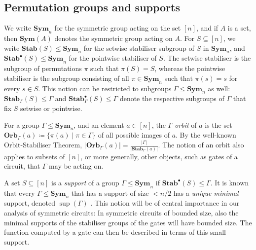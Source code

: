 \documentclass[11pt]{article}
\DeclareMathOperator{\supp}{sup}
\newcommand{\Sym}{\mathbf{Sym}}
\newcommand{\Stab}{\mathbf{Stab}}
\newcommand{\StabP}{\mathbf{Stab}^{\bullet}}
\newcommand{\Orb}{\mathbf{Orb}}
\theoremstyle{definition}
\theoremstyle{plain}
\theoremstyle{remark}
\theoremstyle{remark}
\begin{document}
\subsection{Permutation groups and supports}
\label{sec:permGroups}
We write $\Sym_n$ for the symmetric group acting on the set $[n]$, and if $A$ is a set, then $\Sym(A)$ denotes the symmetric group acting on $A$.
For $S \subseteq [n]$, we write $\Stab(S) \leq \Sym_n$ for the setwise stabiliser subgroup of $S$ in $\Sym_n$, and $\StabP(S) \leq \Sym_n$ for the pointwise stabiliser of $S$. The setwise stabiliser is the subgroup of permutations $\pi$ such that $\pi(S) = S$, whereas the pointwise stabiliser is the subgroup consisting of all $\pi \in \Sym_n$ such that $\pi(s) = s$ for every $s \in S$.
This notion can be restricted to subgroups $\Gamma \leq \Sym_n$ as well: $\Stab_\Gamma(S) \leq \Gamma$ and $\StabP_\Gamma(S) \leq \Gamma$ denote the respective subgroups of $\Gamma$ that fix $S$ setwise or pointwise.

For a group $\Gamma \leq \Sym_n$, and an element $a \in [n]$, the \emph{$\Gamma$-orbit} of $a$ is the set $\Orb_\Gamma(a) \coloneqq \{ \pi(a) \mid \pi \in \Gamma  \}$ of all possible images of $a$.
By the well-known Orbit-Stabiliser Theorem, $|\Orb_\Gamma(a)| = \frac{|\Gamma|}{|\Stab_\Gamma(a)|}$.
The notion of an orbit also applies to subsets of $[n]$, or more generally, other objects, such as gates of a circuit, that $\Gamma$ may be acting on.  

A set $S \subseteq [n]$ is a \emph{support} of a group $\Gamma \leq \Sym_n$ if $\StabP(S) \leq \Gamma$. It is known that every $\Gamma \leq \Sym_n$ that has a support of size $< n/2$ has a \emph{unique minimal} support, denoted $\supp(\Gamma)$ \cite[Lemma 26]{blass1999choiceless}.
This notion will be of central importance in our analysis of symmetric circuits:
In symmetric circuits of bounded size, also the minimal supports of the stabiliser groups of the gates will have bounded size. The function computed by a gate can then be described in terms of this small support.
\end{document}
